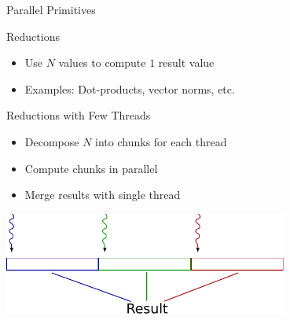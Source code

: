 

\begin{frame}{Parallel Primitives}

\begin{block}{Reductions}
  \begin{itemize}
   \item Use $N$ values to compute $1$ result value
   \item Examples: Dot-products, vector norms, etc.
  \end{itemize}
\end{block}

\begin{block}{Reductions with Few Threads}
  \begin{itemize}
   \item Decompose $N$ into chunks for each thread
   \item Compute chunks in parallel
   \item Merge results with single thread
  \end{itemize}
\end{block}

\begin{center} \includegraphics[width=0.7\textwidth]{figures/reductions-thread} \end{center}

\end{frame}





